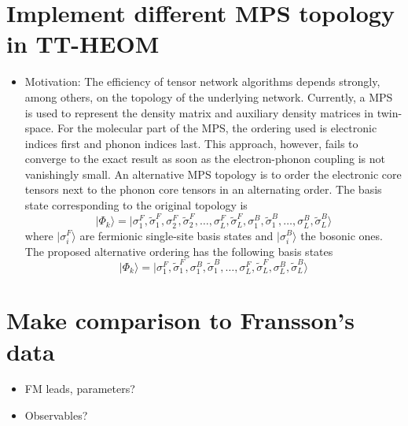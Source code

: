 \documentclass{article}
\begin{document}
\section{Implement different MPS topology in TT-HEOM}
\begin{itemize}
	\item Motivation: The efficiency of tensor network algorithms depends strongly, among others, on the topology of the underlying network. Currently, a MPS is used to represent the density matrix and auxiliary density matrices in twin-space. For the molecular part of the MPS, the ordering used is electronic indices first and phonon indices last. This approach, however, fails to converge to the exact result as soon as the electron-phonon coupling is not vanishingly small. An alternative MPS topology is to order the electronic core tensors next to the phonon core tensors in an alternating order. The basis state corresponding to the original topology is 
	\begin{equation}
		\vert \Phi_k \rangle = \vert \sigma_1^F,\tilde{\sigma}_1^F,\sigma_2^F,\tilde{\sigma}_2^F,\dots,\sigma_L^F,\tilde{\sigma}_L^F,\sigma_1^B,\tilde{\sigma}_1^B,\dots,\sigma_L^B,\tilde{\sigma}_L^B\rangle
	\end{equation}
	where $\vert \sigma_i^F\rangle$ are fermionic single-site basis states and $\vert \sigma_i^B\rangle$ the bosonic ones. The proposed alternative ordering has the following basis states
	\begin{equation}
		\vert \Phi_k \rangle = \vert \sigma_1^F,\tilde{\sigma}_1^F,\sigma_1^B,\tilde{\sigma}_1^B,\dots,\sigma_L^F,\tilde{\sigma}_L^F,\sigma_L^B,\tilde{\sigma}_L^B\rangle
	\end{equation}
	
\end{itemize}
\section{Make comparison to Fransson's data}
\begin{itemize}
	\item FM leads, parameters?
	\item Observables?
\end{itemize}
\end{document}
